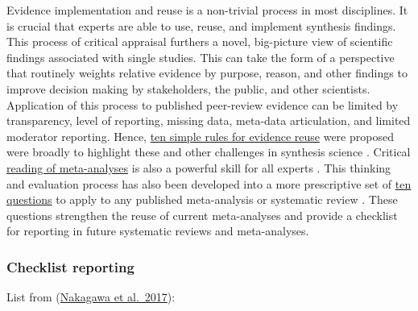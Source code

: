 \documentclass[
]{book}
\begin{document}
Evidence implementation and reuse is a non-trivial process in most disciplines. It is crucial that experts are able to use, reuse, and implement synthesis findings. This process of critical appraisal furthers a novel, big-picture view of scientific findings associated with single studies. This can take the form of a perspective that routinely weights relative evidence by purpose, reason, and other findings to improve decision making by stakeholders, the public, and other scientists. Application of this process to published peer-review evidence can be limited by transparency, level of reporting, missing data, meta-data articulation, and limited moderator reporting. Hence, \href{https://www.facetsjournal.com/doi/10.1139/facets-2020-0021}{ten simple rules for evidence reuse} were proposed were broadly to highlight these and other challenges in synthesis science \citep{RN6861}. Critical \href{https://onlinelibrary.wiley.com/doi/10.1002/jrsm.1109}{reading of meta-analyses} is also a powerful skill for all experts \citep{RN3498}. This thinking and evaluation process has also been developed into a more prescriptive set of \href{https://bmcbiol.biomedcentral.com/articles/10.1186/s12915-017-0357-7}{ten questions} to apply to any published meta-analysis or systematic review \citep{RN7303}. These questions strengthen the reuse of current meta-analyses and provide a checklist for reporting in future systematic reviews and meta-analyses.

\hypertarget{checklist-reporting}{%
\subsubsection*{Checklist reporting}\label{checklist-reporting}}

List from (\href{https://bmcbiol.biomedcentral.com/articles/10.1186/s12915-017-0357-7}{Nakagawa et al.~2017}):
\end{document}
